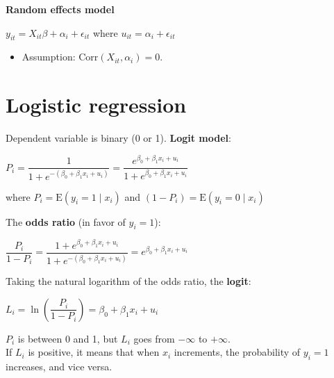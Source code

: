 \documentclass[10pt, a4paper, landscape]{article}
\newcommand{\E}{\mathrm{E}}
\newcommand{\Corr}{\mathrm{Corr}}
\begin{document}
\begin{multicols}{3}
		\textbf{Random effects model}
		
		\begin{center}
			$y_{it} = X_{it} \beta + \alpha_{i} + \epsilon_{it}$ where $u_{it} = \alpha_{i} + \epsilon_{it}$
		\end{center}
		
		\begin{itemize}[leftmargin=*]
			\item Assumption: $\Corr(X_{it}, \alpha_i) = 0$.
		\end{itemize}
		
		\section*{Logistic regression}
		
		Dependent variable is binary (0 or 1). \textbf{Logit model}:
		
		\begin{center}
			$P_{i} = \dfrac{1}{1 + e^{-(\beta_{0} + \beta_{1} x_{i} + u_{i})}}= \dfrac{e^{\beta_{0} + \beta_{1} x_{i} + u_{i}}}{1 + e^{\beta_{0} + \beta_{1} x_{i} + u_{i}}}$
		\end{center}
		
		where $P_{i} = \E(y_{i} = 1 \mid x_{i})$ and $(1 - P_{i}) = \E(y_{i} = 0 \mid x_{i})$
		
		The \textbf{odds ratio} (in favor of $y_{i} = 1$):
		
		\begin{center}
			$\dfrac{P_{i}}{1 - P_{i}} = \dfrac{1 + e^{\beta_{0} + \beta_{1} x_{i} + u_{i}}}{1 + e^{-(\beta_{0} + \beta_{1} x_{i} + u_{i})}} = e^{\beta_{0} + \beta_{1} x_{i} + u_{i}}$
		\end{center}
		
		Taking the natural logarithm of the odds ratio, the \textbf{logit}:
		
		\begin{center}
			$L_{i} = \ln \left( \dfrac{P_i}{1 - P_i}\right) = \beta_{0} + \beta_{1} x_{i} + u_{i}$
		\end{center}
		
		\setlength{\multicolsep}{6pt}
		\begin{multicols}{2}
			$P_{i}$ is between 0 and 1, but $L_{i}$ goes from $-\infty$ to $+\infty$. \\
			
			If $L_{i}$ is positive, it means that when $x_{i}$ increments, the probability of $y_{i} = 1$ increases, and vice versa.
			
			\columnbreak
			

\end{multicols}
\end{multicols}
\end{document}
